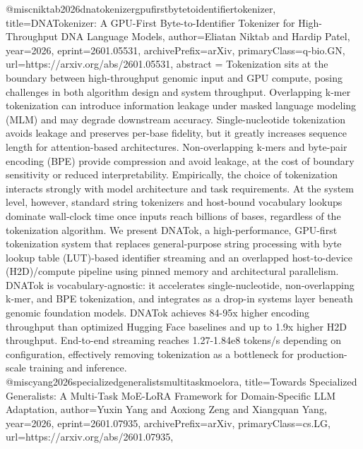 {}@misc{niktab2026dnatokenizergpufirstbytetoidentifiertokenizer,
      title={DNATokenizer: A GPU-First Byte-to-Identifier Tokenizer for High-Throughput DNA Language Models}, 
      author={Eliatan Niktab and Hardip Patel},
      year={2026},
      eprint={2601.05531},
      archivePrefix={arXiv},
      primaryClass={q-bio.GN},
      url={https://arxiv.org/abs/2601.05531},
      abstract = {Tokenization sits at the boundary between high-throughput genomic input and GPU compute, posing challenges in both algorithm design and system throughput. Overlapping k-mer tokenization can introduce information leakage under masked language modeling (MLM) and may degrade downstream accuracy. Single-nucleotide tokenization avoids leakage and preserves per-base fidelity, but it greatly increases sequence length for attention-based architectures. Non-overlapping k-mers and byte-pair encoding (BPE) provide compression and avoid leakage, at the cost of boundary sensitivity or reduced interpretability. Empirically, the choice of tokenization interacts strongly with model architecture and task requirements. At the system level, however, standard string tokenizers and host-bound vocabulary lookups dominate wall-clock time once inputs reach billions of bases, regardless of the tokenization algorithm. We present DNATok, a high-performance, GPU-first tokenization system that replaces general-purpose string processing with byte lookup table (LUT)-based identifier streaming and an overlapped host-to-device (H2D)/compute pipeline using pinned memory and architectural parallelism. DNATok is vocabulary-agnostic: it accelerates single-nucleotide, non-overlapping k-mer, and BPE tokenization, and integrates as a drop-in systems layer beneath genomic foundation models. DNATok achieves 84-95x higher encoding throughput than optimized Hugging Face baselines and up to 1.9x higher H2D throughput. End-to-end streaming reaches 1.27-1.84e8 tokens/s depending on configuration, effectively removing tokenization as a bottleneck for production-scale training and inference.}
}@misc{yang2026specializedgeneralistsmultitaskmoelora,
      title={Towards Specialized Generalists: A Multi-Task MoE-LoRA Framework for Domain-Specific LLM Adaptation}, 
      author={Yuxin Yang and Aoxiong Zeng and Xiangquan Yang},
      year={2026},
      eprint={2601.07935},
      archivePrefix={arXiv},
      primaryClass={cs.LG},
      url={https://arxiv.org/abs/2601.07935},
}
